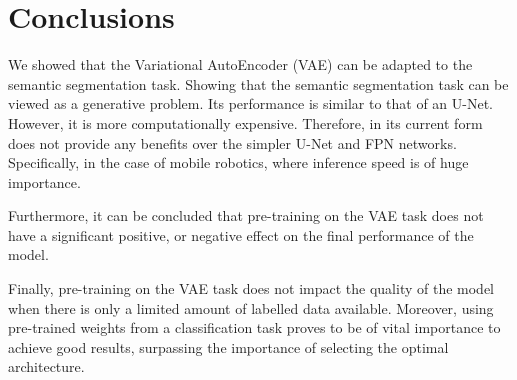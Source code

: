 \chapter{Conclusions}\label{chapter:conclusions}

We showed that the Variational AutoEncoder (VAE) can be adapted to the semantic segmentation task. Showing that the semantic segmentation task can be viewed as a generative problem. Its performance is similar to that of an U-Net. However, it is more computationally expensive. Therefore, in its current form does not provide any benefits over the simpler U-Net and FPN networks. Specifically, in the case of mobile robotics, where inference speed is of huge importance.

Furthermore, it can be concluded that pre-training on the VAE task does not have a significant positive, or negative effect on the final performance of the model. 

Finally, pre-training on the VAE task does not impact the quality of the model when there is only a limited amount of labelled data available. Moreover, using pre-trained weights from a classification task proves to be of vital importance to achieve good results, surpassing the importance of selecting the optimal architecture.
